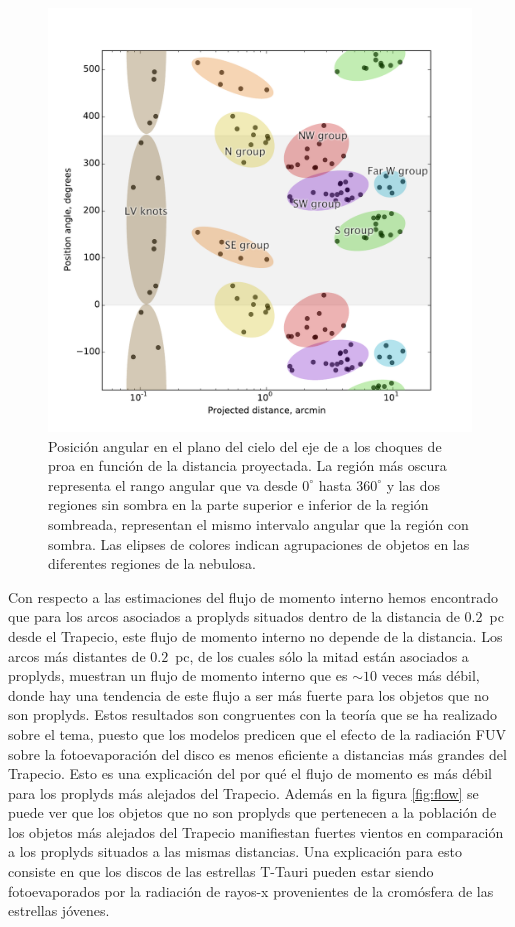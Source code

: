 \begin{figure}
  \centering
  \includegraphics[width=\linewidth, clip]{arc-classify}
  \caption{Posición angular en el plano del cielo del eje de \thC{} a los choques de proa en función de la distancia proyectada. La región más oscura representa el rango angular que va desde \(0^{\circ}\) hasta \(360^{\circ}\) y las dos regiones sin sombra en la parte superior e inferior de la región sombreada, representan el mismo intervalo angular que la región con sombra. Las elipses de colores indican agrupaciones de objetos en las diferentes regiones de la nebulosa. }
 \label{fig:town}
\end{figure}

Con respecto a las estimaciones del flujo de momento interno hemos encontrado que para los arcos asociados a proplyds situados dentro de la distancia de \(0.2\)~pc desde el Trapecio, este flujo de momento interno no depende de la distancia. Los arcos más distantes de \(0.2\)~pc, de los cuales sólo la mitad están asociados a proplyds, muestran un flujo de momento interno que es \(\sim 10\) veces más débil, donde hay una tendencia de este flujo a ser más fuerte para los objetos que no son proplyds. Estos resultados son congruentes con la teoría que se ha realizado sobre el tema, puesto que los modelos predicen que el efecto de la radiación FUV sobre la fotoevaporación del disco es menos eficiente a distancias más grandes del Trapecio. Esto es una explicación del por qué el flujo de momento es más débil para los proplyds más alejados del Trapecio. Además en la figura \ref{fig:flow} se puede ver que los objetos que no son proplyds que pertenecen a la población de los objetos más alejados del Trapecio manifiestan fuertes vientos en comparación a los proplyds situados a las mismas distancias. Una explicación para esto consiste en que los discos de las estrellas T-Tauri pueden estar siendo fotoevaporados por la radiación de rayos-x provenientes de la cromósfera de las estrellas jóvenes. \\

